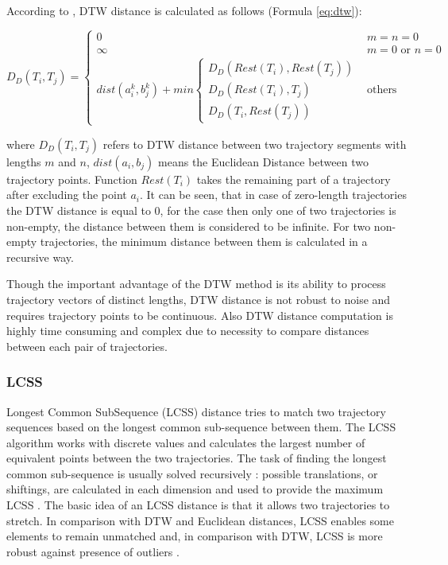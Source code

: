 According to \cite{article:8_review_mot_cl_alg}, DTW distance is calculated as follows (Formula \ref{eq:dtw}):

\begin{equation} \label{eq:dtw}
	D_D(T_i, T_j) = 
		\begin{cases}
			0 				&\text{$m = n = 0$}\\
			\infty 			&\text{$m = 0$ or $n = 0$}\\
			dist(a_i^k, b_j^k) + min 
				\begin{cases}
					D_D(Rest(T_i), Rest(T_j))\\
					D_D(Rest(T_i), T_j)\\
					D_D(T_i, Rest(T_j))
				\end{cases} &\text{others}
		\end{cases}
\end{equation}

where $D_D(T_i, T_j)$ refers to DTW distance between two trajectory segments with lengths $m$ and $n$, $dist(a_i, b_j)$ means the Euclidean Distance between two trajectory points. Function $Rest(T_i)$ takes the remaining part of a trajectory after excluding the point $a_i$. It can be seen, that in case of zero-length trajectories the DTW distance is equal to 0, for the case then only one of two trajectories is non-empty, the distance between them is considered to be infinite. For two non-empty trajectories, the minimum distance between them is calculated in a recursive way.

Though the important advantage of the DTW method is its ability to process trajectory vectors of distinct lengths, DTW distance is not robust to noise and requires trajectory points to be continuous. Also DTW distance computation is highly time consuming and complex due to necessity to compare distances between each pair of trajectories.

\subsubsection{LCSS}
Longest Common SubSequence (LCSS) distance tries to match two trajectory sequences based on the longest common sub-sequence between them. The LCSS algorithm works with discrete values and calculates the largest number of equivalent points between the two trajectories. The task of finding the longest common sub-sequence is usually solved recursively \cite{article:8_review_mot_cl_alg}: possible translations, or shiftings, are calculated in each dimension and used to provide the maximum LCSS \cite{online:r_lcss}. The basic idea of an LCSS distance is that it allows two trajectories to stretch. In comparison with DTW and Euclidean distances, LCSS enables some elements to remain unmatched \cite{article:tr_sim_meas} and, in comparison with DTW, LCSS is more robust against presence of outliers \cite{article:ind_mult_ts}.

